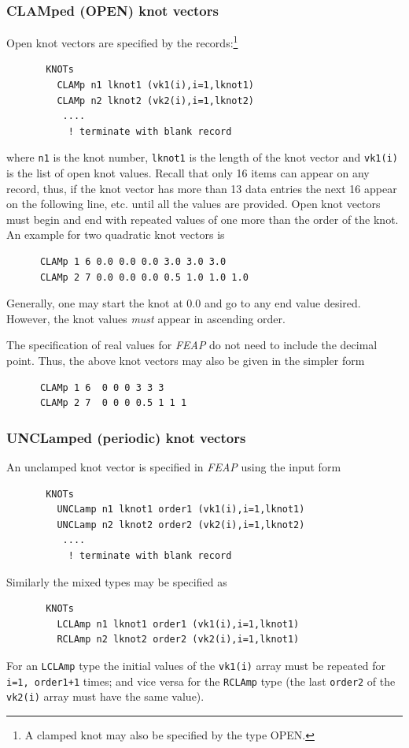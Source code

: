 \subsubsection{CLAMped (OPEN) knot vectors}

Open knot vectors are specified by the records:\footnote{A clamped knot
may also be specified by the type OPEN.}
\setlength{\baselineskip}{12pt}
\begin{verbatim}
       KNOTs
         CLAMp n1 lknot1 (vk1(i),i=1,lknot1)
         CLAMp n2 lknot2 (vk2(i),i=1,lknot2)
          ....
           ! terminate with blank record
\end{verbatim}
\setlength{\baselineskip}{14pt}
where \texttt{n1} is the knot number, \texttt{lknot1} is the length of
the knot vector and \texttt{vk1(i)} is the list of open knot values.
Recall that only 16 items can appear on any record, thus, if the knot vector has more than 13 data entries the next 16 appear on the following line, etc.
until all the values are provided.  Open
knot vectors must begin and end with repeated values of one more than the
order of the knot.  An example for two quadratic knot vectors is
\setlength{\baselineskip}{12pt}
\begin{verbatim}
      CLAMp 1 6 0.0 0.0 0.0 3.0 3.0 3.0
      CLAMp 2 7 0.0 0.0 0.0 0.5 1.0 1.0 1.0
\end{verbatim}
\setlength{\baselineskip}{14pt}
Generally, one may start the knot at $0.0$ and go to any end value desired.  
However, the knot values \textit{must} appear in ascending order.

The specification of real values for \textsl{FEAP} do not need to
include the decimal point.  Thus, the above knot vectors may also be
given in the simpler form
\setlength{\baselineskip}{12pt}
\begin{verbatim}
      CLAMp 1 6  0 0 0 3 3 3
      CLAMp 2 7  0 0 0 0.5 1 1 1
\end{verbatim}
\setlength{\baselineskip}{14pt}

\subsubsection{UNCLamped (periodic) knot vectors}

An unclamped knot vector is specified in \textsl{FEAP} using the input form
\setlength{\baselineskip}{12pt}
\begin{verbatim}
       KNOTs
         UNCLamp n1 lknot1 order1 (vk1(i),i=1,lknot1)
         UNCLamp n2 lknot2 order2 (vk2(i),i=1,lknot2)
          ....
           ! terminate with blank record
\end{verbatim}
\setlength{\baselineskip}{14pt}
Similarly the mixed types may be specified as
\setlength{\baselineskip}{12pt}
\begin{verbatim}
       KNOTs
         LCLAmp n1 lknot1 order1 (vk1(i),i=1,lknot1)
         RCLAmp n2 lknot2 order2 (vk2(i),i=1,lknot1)
\end{verbatim}
\setlength{\baselineskip}{14pt}
For an \texttt{LCLAmp} type the initial values of the \texttt{vk1(i)} array
must be repeated for \texttt{i=1, order1+1} times; and vice versa for the
\texttt{RCLAmp} type (the last \texttt{order2} of the \texttt{vk2(i)} array
must have the same value).

